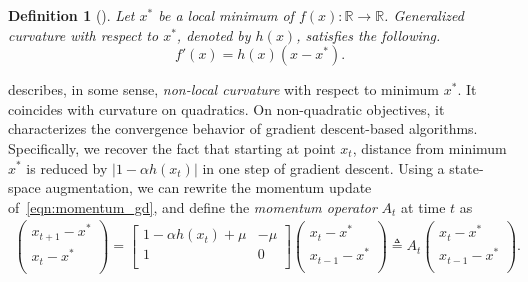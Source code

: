 \documentclass{article} %
\newtheorem{definition}[theorem]{Definition}
\newcommand{\mat}[1]{\bm{\mathit{#1}}}
\begin{document}
\begin{definition}[\Gc]
\label{def:generalized_curvature}
Let $x^*$ be a local minimum of $f(x):\mathbb{R}\rightarrow\mathbb{R}$.
Generalized curvature with respect to $x^*$, denoted by $h(x)$, satisfies the following.
\begin{equation}
	 f'(x) = h(x) (x - x^*). 
	\label{eqn:generalized_curvature}
\end{equation}
\end{definition}
\Gc describes, in some sense, \emph{non-local curvature} with respect to minimum $x^*$.
It coincides with curvature on quadratics.
On non-quadratic objectives, it characterizes the convergence behavior of gradient descent-based algorithms.
Specifically, we recover the fact that starting at point $x_t$, distance from minimum $x^*$ is reduced by $|1-\alpha h(x_t)|$ in one step of gradient descent.
Using a state-space augmentation, we can rewrite the momentum update of~\eqref{eqn:momentum_gd}, and define the {\em momentum operator} $\mat{A}_t$ at time $t$ as
\begin{align}
{\begin{pmatrix}
x_{t+1} - x^*\\
x_t - x^* \\
\end{pmatrix}}
=
{\begin{bmatrix}
1-\alpha h(x_t) + \mu & - \mu \\
1 & 0 \\
\end{bmatrix}}
{\begin{pmatrix}
x_t - x^* \\
x_{t-1} - x^*\\
\end{pmatrix}}
\triangleq
\mat{A}_t
{\begin{pmatrix}
x_t - x^* \\
x_{t-1} - x^*\\
\end{pmatrix}}.
\label{equ:one_dim_22_rec}
\end{align}
\end{document}

